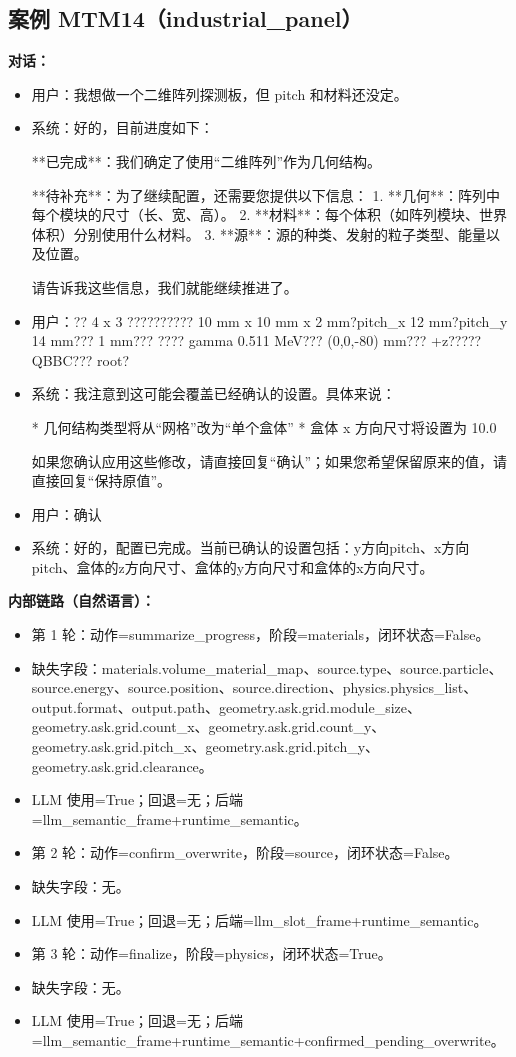 \documentclass[11pt]{ctexart}
\begin{document}
\subsection{案例 MTM14（industrial\_panel）}
\textbf{对话：}
\begin{itemize}
\item 用户：我想做一个二维阵列探测板，但 pitch 和材料还没定。
\item 系统：好的，目前进度如下：

**已完成**：我们确定了使用“二维阵列”作为几何结构。

**待补充**：为了继续配置，还需要您提供以下信息：
1.  **几何**：阵列中每个模块的尺寸（长、宽、高）。
2.  **材料**：每个体积（如阵列模块、世界体积）分别使用什么材料。
3.  **源**：源的种类、发射的粒子类型、能量以及位置。

请告诉我这些信息，我们就能继续推进了。
\item 用户：?? 4 x 3 ?????????? 10 mm x 10 mm x 2 mm?pitch\_x 12 mm?pitch\_y 14 mm??? 1 mm??? ???? gamma 0.511 MeV??? (0,0,-80) mm??? +z????? QBBC??? root?
\item 系统：我注意到这可能会覆盖已经确认的设置。具体来说：

*   几何结构类型将从“网格”改为“单个盒体”
*   盒体 x 方向尺寸将设置为 10.0

如果您确认应用这些修改，请直接回复“确认”；如果您希望保留原来的值，请直接回复“保持原值”。
\item 用户：确认
\item 系统：好的，配置已完成。当前已确认的设置包括：y方向pitch、x方向pitch、盒体的z方向尺寸、盒体的y方向尺寸和盒体的x方向尺寸。
\end{itemize}
\textbf{内部链路（自然语言）：}
\begin{itemize}
\item 第 1 轮：动作=summarize\_progress，阶段=materials，闭环状态=False。
\item 缺失字段：materials.volume\_material\_map、source.type、source.particle、source.energy、source.position、source.direction、physics.physics\_list、output.format、output.path、geometry.ask.grid.module\_size、geometry.ask.grid.count\_x、geometry.ask.grid.count\_y、geometry.ask.grid.pitch\_x、geometry.ask.grid.pitch\_y、geometry.ask.grid.clearance。
\item LLM 使用=True；回退=无；后端=llm\_semantic\_frame+runtime\_semantic。
\item 第 2 轮：动作=confirm\_overwrite，阶段=source，闭环状态=False。
\item 缺失字段：无。
\item LLM 使用=True；回退=无；后端=llm\_slot\_frame+runtime\_semantic。
\item 第 3 轮：动作=finalize，阶段=physics，闭环状态=True。
\item 缺失字段：无。
\item LLM 使用=True；回退=无；后端=llm\_semantic\_frame+runtime\_semantic+confirmed\_pending\_overwrite。
\end{itemize}
\end{document}

